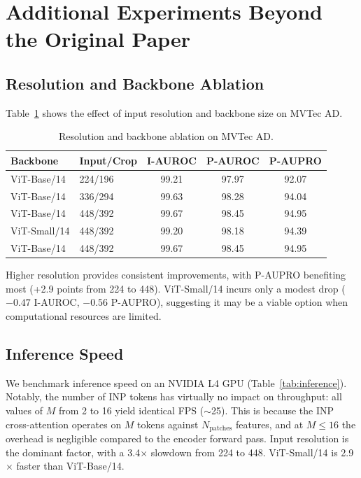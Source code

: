 \documentclass[10pt]{article} %
\begin{document}
\section{Additional Experiments Beyond the Original Paper}
\label{sec:extensions}

\subsection{Resolution and Backbone Ablation}

Table~\ref{tab:resolution} shows the effect of input resolution and backbone size on MVTec AD.

\begin{table}[t]
\caption{Resolution and backbone ablation on MVTec AD.}
\label{tab:resolution}
\begin{center}
\begin{tabular}{llccc}
\toprule
Backbone & Input/Crop & I-AUROC & P-AUROC & P-AUPRO \\
\midrule
ViT-Base/14 & 224/196 & 99.21 & 97.97 & 92.07 \\
ViT-Base/14 & 336/294 & 99.63 & 98.28 & 94.04 \\
ViT-Base/14 & 448/392 & 99.67 & 98.45 & 94.95 \\
\midrule
ViT-Small/14 & 448/392 & 99.20 & 98.18 & 94.39 \\
ViT-Base/14  & 448/392 & 99.67 & 98.45 & 94.95 \\
\bottomrule
\end{tabular}
\end{center}
\end{table}

Higher resolution provides consistent improvements, with P-AUPRO benefiting most (+2.9 points from 224 to 448). ViT-Small/14 incurs only a modest drop ($-0.47$ I-AUROC, $-0.56$ P-AUPRO), suggesting it may be a viable option when computational resources are limited.


\subsection{Inference Speed}
\label{sec:inference}

We benchmark inference speed on an NVIDIA L4 GPU (Table~\ref{tab:inference}). Notably, the number of INP tokens has virtually no impact on throughput: all values of $M$ from 2 to 16 yield identical FPS ($\sim$25). This is because the INP cross-attention operates on $M$ tokens against $N_\text{patches}$ features, and at $M \leq 16$ the overhead is negligible compared to the encoder forward pass. Input resolution is the dominant factor, with a 3.4$\times$ slowdown from 224 to 448. ViT-Small/14 is 2.9$\times$ faster than ViT-Base/14.
\end{document}
